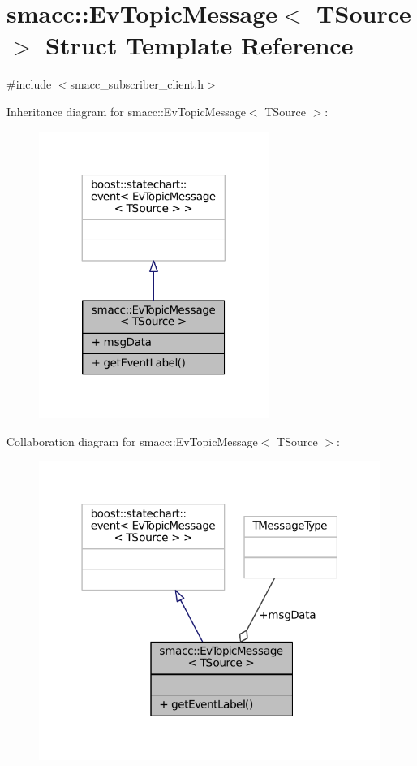 \hypertarget{structsmacc_1_1EvTopicMessage}{}\section{smacc\+:\+:Ev\+Topic\+Message$<$ T\+Source $>$ Struct Template Reference}
\label{structsmacc_1_1EvTopicMessage}


{\ttfamily \#include $<$smacc\+\_\+subscriber\+\_\+client.\+h$>$}



Inheritance diagram for smacc\+:\+:Ev\+Topic\+Message$<$ T\+Source $>$\+:
\nopagebreak
\begin{figure}[H]
\begin{center}
\leavevmode
\includegraphics[width=212pt]{structsmacc_1_1EvTopicMessage__inherit__graph}
\end{center}
\end{figure}


Collaboration diagram for smacc\+:\+:Ev\+Topic\+Message$<$ T\+Source $>$\+:
\nopagebreak
\begin{figure}[H]
\begin{center}
\leavevmode
\includegraphics[width=316pt]{structsmacc_1_1EvTopicMessage__coll__graph}
\end{center}
\end{figure}
